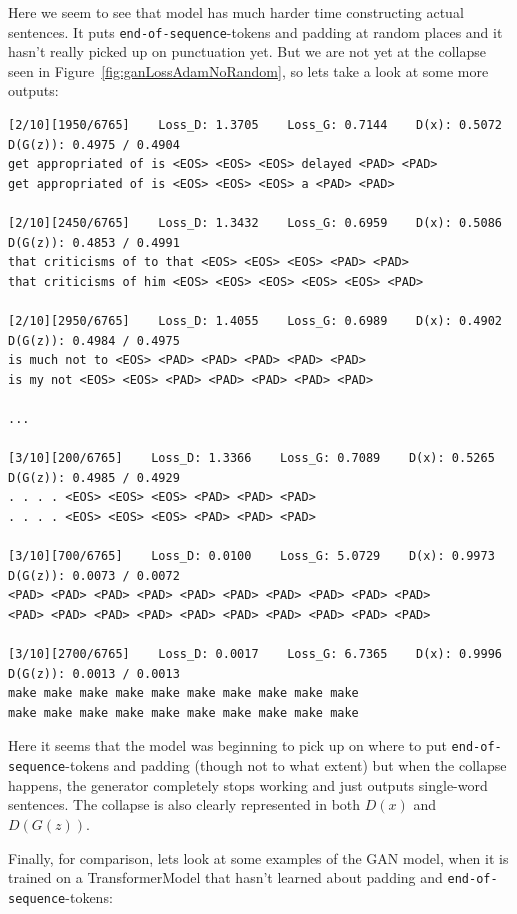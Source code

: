 \documentclass{article}
\begin{document}
Here we seem to see that model has much harder time constructing actual
sentences. It puts \texttt{end-of-sequence}-tokens and padding at random places
and it hasn't really picked up on punctuation yet. But we are not yet at the
collapse seen in Figure~\ref{fig:ganLossAdamNoRandom}, so lets take a look at
some more outputs:

\begin{verbatim}
[2/10][1950/6765]    Loss_D: 1.3705    Loss_G: 0.7144    D(x): 0.5072    D(G(z)): 0.4975 / 0.4904
get appropriated of is <EOS> <EOS> <EOS> delayed <PAD> <PAD>
get appropriated of is <EOS> <EOS> <EOS> a <PAD> <PAD>

[2/10][2450/6765]    Loss_D: 1.3432    Loss_G: 0.6959    D(x): 0.5086    D(G(z)): 0.4853 / 0.4991
that criticisms of to that <EOS> <EOS> <EOS> <PAD> <PAD>
that criticisms of him <EOS> <EOS> <EOS> <EOS> <EOS> <PAD>

[2/10][2950/6765]    Loss_D: 1.4055    Loss_G: 0.6989    D(x): 0.4902    D(G(z)): 0.4984 / 0.4975
is much not to <EOS> <PAD> <PAD> <PAD> <PAD> <PAD>
is my not <EOS> <EOS> <PAD> <PAD> <PAD> <PAD> <PAD>

...

[3/10][200/6765]    Loss_D: 1.3366    Loss_G: 0.7089    D(x): 0.5265    D(G(z)): 0.4985 / 0.4929
. . . . <EOS> <EOS> <EOS> <PAD> <PAD> <PAD>
. . . . <EOS> <EOS> <EOS> <PAD> <PAD> <PAD>

[3/10][700/6765]    Loss_D: 0.0100    Loss_G: 5.0729    D(x): 0.9973    D(G(z)): 0.0073 / 0.0072
<PAD> <PAD> <PAD> <PAD> <PAD> <PAD> <PAD> <PAD> <PAD> <PAD>
<PAD> <PAD> <PAD> <PAD> <PAD> <PAD> <PAD> <PAD> <PAD> <PAD>

[3/10][2700/6765]    Loss_D: 0.0017    Loss_G: 6.7365    D(x): 0.9996    D(G(z)): 0.0013 / 0.0013
make make make make make make make make make make
make make make make make make make make make make

\end{verbatim}

Here it seems that the model was beginning to pick up on where to put
\texttt{end-of-sequence}-tokens and padding (though not to what extent) but when
the collapse happens, the generator completely stops working and just outputs
single-word sentences. The collapse is also clearly represented in both $D(x)$
and $D(G(z))$.

Finally, for comparison, lets look at some examples of the GAN model, when it is
trained on a TransformerModel that hasn't learned about padding and
\texttt{end-of-sequence}-tokens:
\end{document}
